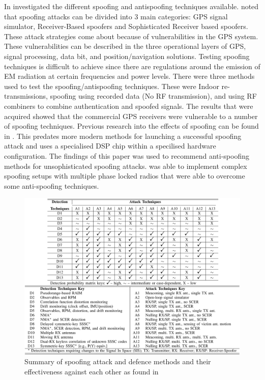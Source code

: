 In \citeyear{RN6} \textcite{RN6} investigated the different spoofing and antispoofing techniques available. \citeauthor{RN6} noted that spoofing attacks can be divided into 3 main categories:
GPS signal simulator, Receiver-Based spoofers and Sophisticated Receiver based spoofers. These attack strategies come about because of vulnerabilities in the GPS system.
These vulnerabilities can be described in the three operational layers of GPS, signal processing, data bit, and position/navigation solutions.
Testing spoofing techniques is difficult to achieve since there are regulations around the emission of EM radiation at certain frequencies and power levels.
There were three methods used to test the spoofing/antispoofing techniques. These were Indoor re-transmissions, spoofing using recorded data (No RF transmission), and
using RF combiners to combine authentication and spoofed signals.
The results that were acquired showed that the commercial GPS receivers were vulnerable to a number of spoofing techniques.
Previous research into the effects of spoofing can be found in \cite{RN23}. This predates more modern methods for launching a successful spoofing attack and uses a
specialised DSP chip within a specilised hardware configuration. The findings of this paper was used to recommend anti-spoofing methods for unsophisticated spoofing
attacks. \citeauthor{RN23} was able to implement complex spoofing setups with multiple phase locked radios that were able to overcome some anti-spoofing techniques. 

\begin{figure}[h]
    \begin{centering}
        \includegraphics[width=14cm, keepaspectratio]{Figures/Attack and defence summary.png}
        \caption{Summary of spoofing attack and defence methods and their effectiveness against each other as found in \cite{RN12}}
    \label{fig:SpoofDefenceSumm}
    \end{centering}
\end{figure}

